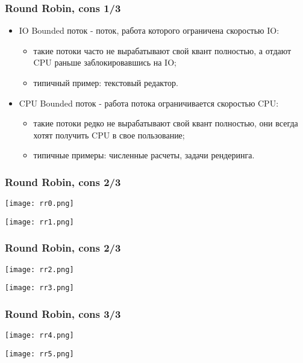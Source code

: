 \begin{frame}
\frametitle{Round Robin, cons 1/3}
\begin{itemize}
  \item IO Bounded поток - поток, работа которого ограничена скоростью IO:
  \begin{itemize}
    \item такие потоки часто не вырабатывают свой квант полностью, а отдают
    CPU раньше заблокировавшись на IO;
    \item типичный пример: текстовый редактор.
  \end{itemize}
  \item CPU Bounded поток - работа потока ограничивается скоростью CPU:
  \begin{itemize}
    \item такие потоки редко не вырабатывают свой квант полностью, они всегда
    хотят получить CPU в свое пользование;
    \item типичные примеры: численные расчеты, задачи рендеринга.
  \end{itemize}
\end{itemize}
\end{frame}

\begin{frame}
\frametitle{Round Robin, cons 2/3}
\begin{center}
  \texttt{[image: rr0.png]}
\end{center}
\begin{center}
  \texttt{[image: rr1.png]}
\end{center}
\end{frame}

\begin{frame}
\frametitle{Round Robin, cons 2/3}
\begin{center}
  \texttt{[image: rr2.png]}
\end{center}
\begin{center}
  \texttt{[image: rr3.png]}
\end{center}
\end{frame}

\begin{frame}
\frametitle{Round Robin, cons 3/3}
\begin{center}
  \texttt{[image: rr4.png]}
\end{center}
\begin{center}
  \texttt{[image: rr5.png]}
\end{center}
\end{frame}

